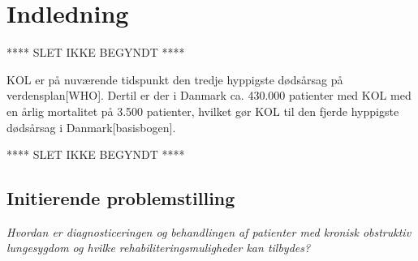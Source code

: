 \chapter{Indledning}
 
 **** SLET IKKE BEGYNDT ****

KOL er på nuværende tidspunkt den tredje hyppigste dødsårsag på verdensplan[WHO]. Dertil er der i Danmark ca. 430.000 patienter med KOL med en årlig mortalitet på 3.500 patienter, hvilket gør KOL til den fjerde hyppigste dødsårsag i Danmark[basisbogen].


 **** SLET IKKE BEGYNDT ****



\section{Initierende problemstilling}
\textit{Hvordan er diagnosticeringen og behandlingen af patienter med kronisk obstruktiv lungesygdom og hvilke rehabiliteringsmuligheder kan tilbydes?}